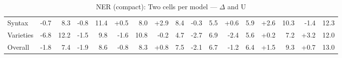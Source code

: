 \begin{table}[h]
{\begin{tabular}{lrrrrrrrrrrrrrrrr}
Syntax & \cellcolor{red!1} -0.7 & \cellcolor{blue!21} 8.3 & \cellcolor{red!1} -0.8 & \cellcolor{blue!29} 11.4 & \cellcolor{green!0} +0.5 & \cellcolor{blue!21} 8.0 & \cellcolor{green!5} +2.9 & \cellcolor{blue!22} 8.4 & \cellcolor{red!0} -0.3 & \cellcolor{blue!14} 5.5 & \cellcolor{green!1} +0.6 & \cellcolor{blue!15} 5.9 & \cellcolor{green!5} +2.6 & \cellcolor{blue!27} 10.3 & \cellcolor{red!2} -1.4 & \cellcolor{blue!32} 12.3 \\
Varieties & \cellcolor{red!13} -6.8 & \cellcolor{blue!31} 12.2 & \cellcolor{red!3} -1.5 & \cellcolor{blue!25} 9.8 & \cellcolor{red!3} -1.6 & \cellcolor{blue!28} 10.8 & \cellcolor{red!0} -0.2 & \cellcolor{blue!12} 4.7 & \cellcolor{red!5} -2.7 & \cellcolor{blue!18} 6.9 & \cellcolor{red!4} -2.4 & \cellcolor{blue!14} 5.6 & \cellcolor{green!0} +0.2 & \cellcolor{blue!19} 7.2 & \cellcolor{green!6} +3.2 & \cellcolor{blue!31} 12.0 \\
Overall & \cellcolor{red!3} -1.8 & \cellcolor{blue!19} 7.4 & \cellcolor{red!3} -1.9 & \cellcolor{blue!22} 8.6 & \cellcolor{red!1} -0.8 & \cellcolor{blue!21} 8.3 & \cellcolor{green!1} +0.8 & \cellcolor{blue!19} 7.5 & \cellcolor{red!4} -2.1 & \cellcolor{blue!17} 6.7 & \cellcolor{red!2} -1.2 & \cellcolor{blue!16} 6.4 & \cellcolor{green!2} +1.5 & \cellcolor{blue!24} 9.3 & \cellcolor{green!1} +0.7 & \cellcolor{blue!33} 13.0 \\
\bottomrule
\end{tabular}}
\caption{NER (compact): Two cells per model — $\Delta$ and U}\label{tab:ner_compact_combined_cells}
\end{table}